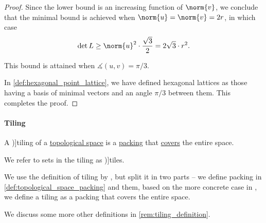 \begin{proof}
  Since the lower bound is an increasing function of \( \norm{v} \), we conclude that the minimal bound is achieved when \( \norm{u} = \norm{v} = 2r \), in which case
  \begin{equation*}
    \det L \geq \norm{u}^2 \cdot \frac {\sqrt 3} 2 = 2\sqrt 3 \cdot r^2.
  \end{equation*}

  This bound is attained when \( \measuredangle(u, v) = \pi / 3 \).

  In \cref{def:hexagonal_point_lattice}, we have defined hexagonal lattices as those having a basis of minimal vectors and an angle \( \pi / 3 \) between them. This completes the proof.
\end{proof}

\paragraph{Tiling}

\begin{definition}\label{def:topological_space_tiling}
  A \term[ru=паркет / мозайка (\cite[465]{Маркушевич1967АналитическиеФункцииТом2})]{tiling} of a \hyperref[def:topological_space]{topological space} is a \hyperref[def:topological_space_packing]{packing} that \hyperref[def:set_cover]{covers} the entire space.

  We refer to sets in the tiling as \term[ru=плитка (\cite[465]{Маркушевич1967АналитическиеФункцииТом2})]{tiles}.
\end{definition}
\begin{comments}
  \item We use the definition of tiling by \textcite[611]{Arenas1999Tilings}, but split it in two parts -- we define packing in \cref{def:topological_space_packing} and them, based on the more concrete case in \cite[16]{GrünbaumShephard1987TilingsAndPatterns}, we define a tiling as a packing that covers the entire space.

  \item We discuss some more other definitions in \cref{rem:tiling_definition}.
\end{comments}

